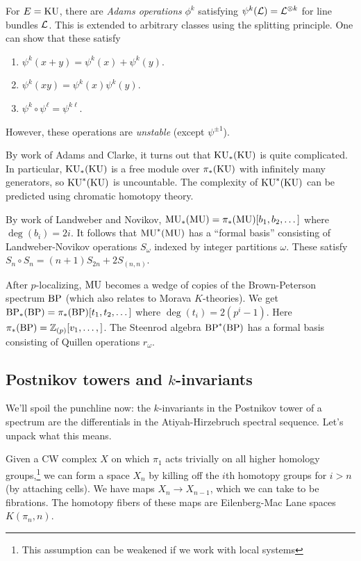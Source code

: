 \documentclass{article}
\begin{document}
\begin{ex}
	For $E = \mathrm{KU}$, there are \emph{Adams operations} $\phi^k$ satisfying $\psi^k(\mathcal{L}) = \mathcal{L}^{\otimes k}$ for line bundles $\mathcal{L}$.
	This is extended to arbitrary classes using the splitting principle.
	One can show that these satisfy
	\begin{enumerate}
		\item $\psi^k(x + y) = \psi^k(x) + \psi^k(y)$.
		\item $\psi^k(xy) = \psi^k(x) \psi^k(y)$.
		\item $\psi^k \circ \psi^\ell = \psi^{k \ell}$.
	\end{enumerate}
	However, these operations are \emph{unstable} (except $\psi^{\pm 1}$).

	By work of Adams and Clarke, it turns out that $\mathrm{KU}_*(\mathrm{KU})$ is quite complicated.
	In particular, $\mathrm{KU}_*(\mathrm{KU})$ is a free module over $\pi_*(\mathrm{KU})$ with infinitely many generators, so $\mathrm{KU}^*(\mathrm{KU})$ is uncountable.
	The complexity of $\mathrm{KU}^*(\mathrm{KU})$ can be predicted using chromatic homotopy theory.
\end{ex}

\begin{ex}
	By work of Landweber and Novikov, $\mathrm{MU}_*(\mathrm{MU}) = \pi_*(\mathrm{MU})[b_1, b_2, \dots]$ where $\deg(b_i) = 2i$.
	It follows that $\mathrm{MU}^*(\mathrm{MU})$ has a ``formal basis'' consisting of Landweber-Novikov operations $S_\omega$ indexed by integer partitions $\omega$.
	These satisfy $S_n \circ S_n = (n + 1) S_{2n} + 2 S_{(n,n)}$.
\end{ex}

\begin{ex}
	After $p$-localizing, $\mathrm{MU}$ becomes a wedge of copies of the Brown-Peterson spectrum $\mathrm{BP}$ (which also relates to Morava $K$-theories).
	We get $\mathrm{BP}_*(\mathrm{BP}) = \pi_*(\mathrm{BP})[t_1, t_2, \dots]$ where $\deg(t_i) = 2(p^i - 1)$.
	Here $\pi_*(\mathrm{BP}) = \mathbb{Z}_{(p)}[v_1, \dots,]$.
	The Steenrod algebra $\mathrm{BP}^*(\mathrm{BP})$ has a formal basis consisting of Quillen operations $r_\omega$.
\end{ex}

\subsection{Postnikov towers and $k$-invariants}

We'll spoil the punchline now: the $k$-invariants in the Postnikov tower of a spectrum are the differentials in the Atiyah-Hirzebruch spectral sequence.
Let's unpack what this means.

Given a CW complex $X$ on which $\pi_1$ acts trivially on all higher homology groups,\footnote{This assumption can be weakened if we work with local systems} we can form a space $X_n$ by killing off the $i$th homotopy groups for $i > n$ (by attaching cells).
We have maps $X_n \to X_{n-1}$, which we can take to be fibrations.
The homotopy fibers of these maps are Eilenberg-Mac Lane spaces $K(\pi_n, n)$.
\end{document}
